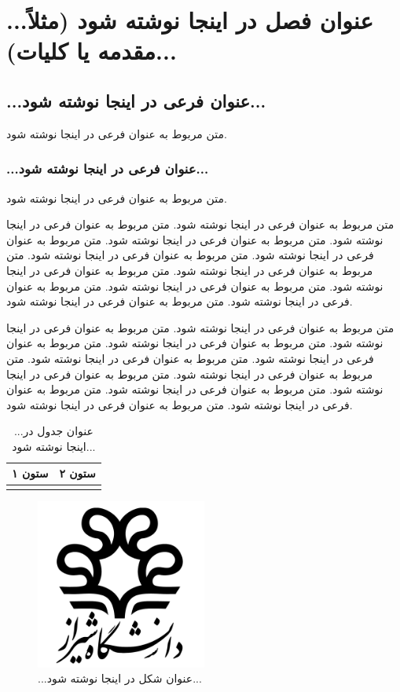 \chapter{...عنوان فصل در اینجا نوشته شود (مثلاً مقدمه یا کلیات)...}

\section{...عنوان فرعی در اینجا نوشته شود...}
متن مربوط به عنوان فرعی در اینجا نوشته شود.

\subsection{...عنوان فرعی در اینجا نوشته شود...}
متن مربوط به عنوان فرعی در اینجا نوشته شود.

\newpage
متن مربوط به عنوان فرعی در اینجا نوشته شود.\cite{sharif_1390}
متن مربوط به عنوان فرعی در اینجا نوشته شود.\cite{ghalamfarsa_1394}
متن مربوط به عنوان فرعی در اینجا نوشته شود.\cite{howitt_2008}
متن مربوط به عنوان فرعی در اینجا نوشته شود.\cite{ranzijn_2009}
متن مربوط به عنوان فرعی در اینجا نوشته شود.\cite{datnoff_2001}
متن مربوط به عنوان فرعی در اینجا نوشته شود.\cite{sas}
متن مربوط به عنوان فرعی در اینجا نوشته شود.\cite{rahimian_1392}
متن مربوط به عنوان فرعی در اینجا نوشته شود.\cite{alishahi_1393}
متن مربوط به عنوان فرعی در اینجا نوشته شود.\cite{andjic_2007}
متن مربوط به عنوان فرعی در اینجا نوشته شود.\cite{sohrabi_2011}

\newpage
متن مربوط به عنوان فرعی در اینجا نوشته شود.\cite{game_2001}
متن مربوط به عنوان فرعی در اینجا نوشته شود.\cite{habibi_1394}
متن مربوط به عنوان فرعی در اینجا نوشته شود.\cite{ignatov_2013}
متن مربوط به عنوان فرعی در اینجا نوشته شود.\cite{bekker_2007}
متن مربوط به عنوان فرعی در اینجا نوشته شود.\cite{aps}
متن مربوط به عنوان فرعی در اینجا نوشته شود.\cite{wikipedia}
متن مربوط به عنوان فرعی در اینجا نوشته شود.
متن مربوط به عنوان فرعی در اینجا نوشته شود.
متن مربوط به عنوان فرعی در اینجا نوشته شود.
متن مربوط به عنوان فرعی در اینجا نوشته شود.

\newpage
\begin{table}[]
    \centering
    \caption{...عنوان جدول در اینجا نوشته شود...}
    \begin{tabular}{|c|c|}
        \hline
        ستون ۱ & ستون ۲ \\
        \hline
               &        \\
        \hline
    \end{tabular}
\end{table}

\begin{figure}
    \centering
    \includegraphics[width=0.5\textwidth]{assets/shiraz_university_logo.pdf}
    \caption{...عنوان شکل در اینجا نوشته شود...}
\end{figure}
